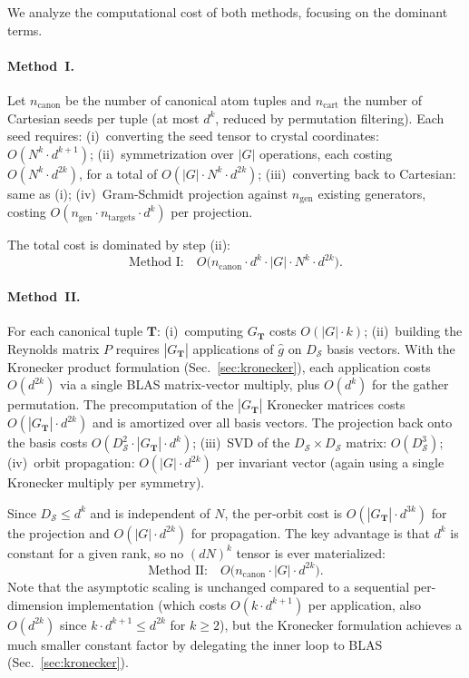 \documentclass[twocolumn,amsmath,amssymb,aps,prb,10pt,floatfix]{revtex4-2}
\newcommand{\vT}{\mathbf{T}}
\begin{document}
We analyze the computational cost of both methods, focusing on the dominant terms.

\paragraph{Method~I.}
Let $n_{\text{canon}}$ be the number of canonical atom tuples and $n_{\text{cart}}$ the number of Cartesian seeds per tuple (at most $d^k$, reduced by permutation filtering).
Each seed requires:
(i)~converting the seed tensor to crystal coordinates: $O(N^k \cdot d^{k+1})$;
(ii)~symmetrization over $|G|$ operations, each costing $O(N^k \cdot d^{2k})$, for a total of $O(|G| \cdot N^k \cdot d^{2k})$;
(iii)~converting back to Cartesian: same as (i);
(iv)~Gram-Schmidt projection against $n_{\text{gen}}$ existing generators, costing $O(n_{\text{gen}} \cdot n_{\text{targets}} \cdot d^k)$ per projection.

The total cost is dominated by step (ii):
\begin{equation}
\text{Method~I:}\quad O\bigl(n_{\text{canon}} \cdot d^k \cdot |G| \cdot N^k \cdot d^{2k}\bigr).
\end{equation}

\paragraph{Method~II.}
For each canonical tuple $\vT$:
(i)~computing $G_{\vT}$ costs $O(|G| \cdot k)$;
(ii)~building the Reynolds matrix $P$ requires $|G_{\vT}|$ applications of $\hat{g}$ on $D_{\mathcal{S}}$ basis vectors.
With the Kronecker product formulation (Sec.~\ref{sec:kronecker}), each application costs $O(d^{2k})$ via a single BLAS matrix-vector multiply, plus $O(d^k)$ for the gather permutation.
The precomputation of the $|G_{\vT}|$ Kronecker matrices costs $O(|G_{\vT}| \cdot d^{2k})$ and is amortized over all basis vectors.
The projection back onto the basis costs $O(D_{\mathcal{S}}^2 \cdot |G_{\vT}| \cdot d^k)$;
(iii)~SVD of the $D_{\mathcal{S}} \times D_{\mathcal{S}}$ matrix: $O(D_{\mathcal{S}}^3)$;
(iv)~orbit propagation: $O(|G| \cdot d^{2k})$ per invariant vector (again using a single Kronecker multiply per symmetry).

Since $D_{\mathcal{S}} \leq d^k$ and is independent of $N$, the per-orbit cost is $O(|G_{\vT}| \cdot d^{3k})$ for the projection and $O(|G| \cdot d^{2k})$ for propagation.
The key advantage is that $d^k$ is constant for a given rank, so no $(dN)^k$ tensor is ever materialized:
\begin{equation}
\text{Method~II:}\quad O\bigl(n_{\text{canon}} \cdot |G| \cdot d^{2k}\bigr).
\end{equation}
Note that the asymptotic scaling is unchanged compared to a sequential per-dimension implementation (which costs $O(k \cdot d^{k+1})$ per application, also $O(d^{2k})$ since $k \cdot d^{k+1} \leq d^{2k}$ for $k \geq 2$), but the Kronecker formulation achieves a much smaller constant factor by delegating the inner loop to BLAS (Sec.~\ref{sec:kronecker}).
\end{document}
